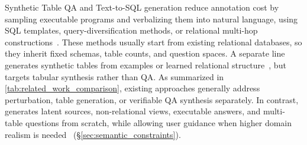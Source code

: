 Synthetic Table QA and Text-to-SQL generation reduce annotation cost by sampling executable programs and verbalizing them into natural language, using SQL templates, query-diversification methods, or relational multi-hop constructions~\cite{9.2,9.5,9.6,9.7,9.8,5.5,5.8}. These methods usually start from existing relational databases, so they inherit fixed schemas, table counts, and question spaces. A separate line generates synthetic tables from examples or learned relational structure~\cite{5.1,5.9,5.10,5.2}, but targets tabular synthesis rather than QA. As summarized in \autoref{tab:related_work_comparison}, existing approaches generally address perturbation, table generation, or verifiable QA synthesis separately. 
In contrast, \name generates latent sources, non-relational views, executable answers, and multi-table questions from scratch, while allowing user guidance when higher domain realism is needed~\cite{5.12} (§\ref{sec:semantic_constraints}).

